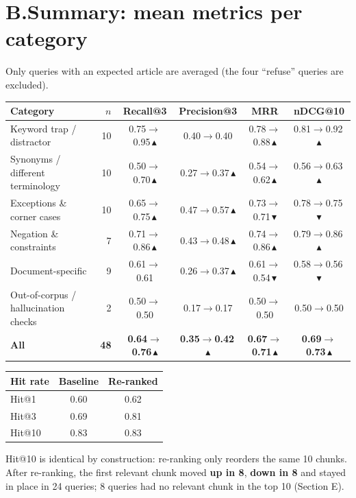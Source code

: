 \documentclass[10pt,a4paper]{article}
\newcommand{\up}{\textcolor{upc}{$\blacktriangle$}}
\newcommand{\down}{\textcolor{downc}{$\blacktriangledown$}}
\begin{document}
\section*{B.\quad Summary: mean metrics per category}
Only queries with an expected article are averaged (the four ``refuse'' queries are excluded).
\begin{center}\small\begin{tabularx}{\linewidth}{@{}YrCCCC@{}}\toprule
Category & $n$ & Recall@3 & Precision@3 & MRR & nDCG@10\\\midrule
Keyword trap / distractor & 10 & 0.75$\to$0.95\,\up & 0.40$\to$0.40 & 0.78$\to$0.88\,\up & 0.81$\to$0.92\,\up\\
Synonyms / different terminology & 10 & 0.50$\to$0.70\,\up & 0.27$\to$0.37\,\up & 0.54$\to$0.62\,\up & 0.56$\to$0.63\,\up\\
Exceptions \& corner cases & 10 & 0.65$\to$0.75\,\up & 0.47$\to$0.57\,\up & 0.73$\to$0.71\,\down & 0.78$\to$0.75\,\down\\
Negation \& constraints & 7 & 0.71$\to$0.86\,\up & 0.43$\to$0.48\,\up & 0.74$\to$0.86\,\up & 0.79$\to$0.86\,\up\\
Document-specific & 9 & 0.61$\to$0.61 & 0.26$\to$0.37\,\up & 0.61$\to$0.54\,\down & 0.58$\to$0.56\,\down\\
Out-of-corpus / hallucination checks & 2 & 0.50$\to$0.50 & 0.17$\to$0.17 & 0.50$\to$0.50 & 0.50$\to$0.50\\
\midrule\textbf{All} & \textbf{48} & \textbf{0.64$\to$0.76\,\up} & \textbf{0.35$\to$0.42\,\up} & \textbf{0.67$\to$0.71\,\up} & \textbf{0.69$\to$0.73\,\up}\\\bottomrule
\end{tabularx}\end{center}
\begin{center}\small\centering\begin{tabular}{@{}lcc@{}}\toprule Hit rate & Baseline & Re-ranked\\\midrule
Hit@1 & 0.60 & 0.62\\
Hit@3 & 0.69 & 0.81\\
Hit@10 & 0.83 & 0.83\\
\bottomrule\end{tabular}\end{center}
Hit@10 is identical by construction: re-ranking only reorders the same 10 chunks. After re-ranking, the first relevant chunk moved \textbf{up in 8}, \textbf{down in 8} and stayed in place in 24 queries; 8 queries had no relevant chunk in the top 10 (Section E).
\end{document}
